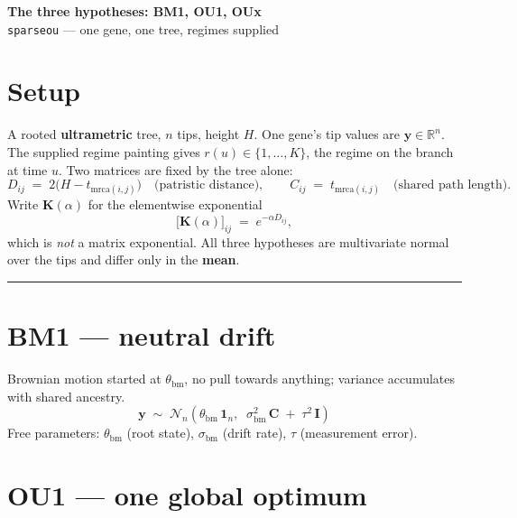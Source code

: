 \documentclass[11pt]{article}
\newcommand{\yv}{\mathbf{y}}
\newcommand{\Cm}{\mathbf{C}}
\newcommand{\Idm}{\mathbf{I}}
\newcommand{\Km}{\mathbf{K}}
\newcommand{\one}{\mathbf{1}}
\begin{document}
\begin{center}
{\large\bfseries The three hypotheses: BM1, OU1, OUx}\\[2pt]
{\footnotesize\texttt{sparseou} --- one gene, one tree, regimes supplied}
\end{center}
\vspace{4pt}

\section*{Setup}

A rooted \textbf{ultrametric} tree, $n$ tips, height $H$. One gene's tip values are
$\yv \in \mathbb{R}^{n}$. The supplied regime painting gives $r(u) \in \{1,\dots,K\}$, the regime on
the branch at time $u$. Two matrices are fixed by the tree alone:
\[
D_{ij} \;=\; 2\bigl(H - t_{\mathrm{mrca}(i,j)}\bigr) \quad\text{(patristic distance)},
\qquad
C_{ij} \;=\; t_{\mathrm{mrca}(i,j)} \quad\text{(shared path length)} .
\]
Write $\Km(\alpha)$ for the elementwise exponential
\[
\bigl[\Km(\alpha)\bigr]_{ij} \;=\; e^{-\alpha D_{ij}} ,
\]
which is \emph{not} a matrix exponential. All three hypotheses are multivariate normal over the
tips and differ only in the \textbf{mean}.

\vspace{6pt}
\hrule
\vspace{8pt}

\section*{BM1 --- neutral drift}

Brownian motion started at $\theta_{\mathrm{bm}}$, no pull towards anything; variance accumulates
with shared ancestry.
\begin{equation*}
\boxed{\;
\yv \;\sim\; \mathcal{N}_{n}\!\left(\theta_{\mathrm{bm}}\,\one_{n},\;\;
   \sigma_{\mathrm{bm}}^{2}\,\Cm \;+\; \tau^{2}\,\Idm\right)
\;}
\end{equation*}
Free parameters: $\theta_{\mathrm{bm}}$ (root state), $\sigma_{\mathrm{bm}}$ (drift rate),
$\tau$ (measurement error).

\vspace{8pt}

\section*{OU1 --- one global optimum}
\end{document}
